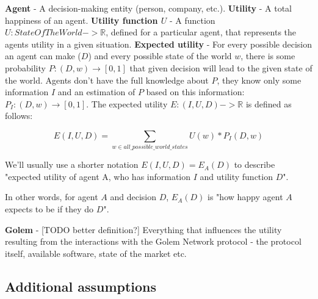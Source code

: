\documentclass{article}
\begin{document}
\textbf{Agent} - A decision-making entity (person, company, etc.).
\newline
\textbf{Utility} - A total happiness of an agent.
\newline
\textbf{Utility function $U$} - A function $U: StateOfTheWorld -> \mathbb{R}$, defined for a particular agent, that represents the agents utility in a given situation.
\newline
\textbf{Expected utility} - For every possible decision an agent can make ($D$) and every possible state of the world $w$, there is some probability $P: (D, w) \rightarrow [0, 1]$  that given decision will lead to the given state of the world.
Agents don't have the full knowledge about $P$, they know only some information $I$ and an estimation of $P$ based on this information: $P_I: (D, w) \rightarrow [0, 1]$. The expected utility $E: (I, U, D) -> \mathbb{R}$ is defined as follows:

\begin{equation}
E(I, U, D) = \sum_{w \in all\_possible\_world\_states}U(w) * P_I(D, w)
\end{equation}

We'll usually use a shorter notation $E(I, U, D) = E_A(D)$ to describe "expected utility of agent A, who has information $I$ and utility function $D$".

In other words, for agent $A$ and decision $D$, $E_A(D)$ is "how happy agent $A$ expects to be if they do $D$".
\newline

\textbf{Golem} - [TODO better definition?] Everything that influences the utility resulting from the interactions with the Golem Network protocol - the protocol itself, available software, state of the market etc.
\newline

\subsection{Additional assumptions}
\end{document}
